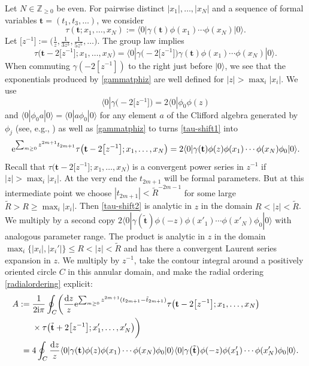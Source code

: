 \documentclass[10pt,a4paper]{amsart}
\numberwithin{equation}{section}
\newcommand{\dd}{\mathrm{d}}
\begin{document}
Let $N\in \mathbb{Z}_{\geq 0}$ be even. For pairwise distinct $|x_1|,\dots,|x_N|$
and a sequence of formal variables $\mathbf{t}=(t_1,t_3,\dots)$, we consider
\[
 \tau(\mathbf{t};x_1,\dots,x_N):= \langle 0 | \gamma(\mathbf{t})
 \phi(x_1)\cdots \phi(x_N)|0\rangle.
\]
Let $\bigl[z^{-1}\bigr]:=\bigl(\frac{1}{z},\frac{1}{3z^3},
\frac{1}{5 z^5},\dots\bigr)$.
 The group law implies
 \begin{equation}
 \tau\bigl(\mathbf{t}-2\bigl[z^{-1}\bigr];x_1,\dots,x_N\bigr) =\langle 0|
 \gamma\bigl(-2\bigl[z^{-1}\bigr]\bigr)
 \gamma(\mathbf{t}) \phi(x_1)\cdots \phi(x_N) |0\rangle.
\label{tau-shift1}
\end{equation}
When commuting $\gamma(-2[z^{-1}])$ to the right just before $|0\rangle$,
we see that the exponentials produced by \eqref{gammatphiz}
are well defined for $|z|>\max_i |x_i|$. We use
\cite[Lemma 7.3.9]{harnad_balogh_2021}
\[
 \langle 0|\gamma\bigl(-2\bigl[z^{-1}\bigr]\bigr)=2
 \langle 0|\phi_0 \phi(z)
\]
and
$\langle 0|\phi_0 a|0 \rangle=
\langle 0|a\phi_0 |0 \rangle$ for any element $a$ of the Clifford algebra
generated by $\phi_j$ (see, e.g., \cite[Exercise 7.5]{harnad_balogh_2021})
as well as \eqref{gammatphiz} to turns \eqref{tau-shift1} into
\begin{equation}
{\rm e}^{\sum_{m \geq 0} z^{2m+1}t_{2m+1}} \tau\bigl(\mathbf{t}-2\bigl[z^{-1}\bigr];x_1,\dots,x_N\bigr)
= 2 \langle 0|\gamma(\mathbf{t}) \phi(z)
\phi(x_1)\cdots \phi(x_N)\phi_0|0\rangle .
 \label{tau-shift2}
\end{equation}
Recall that $\tau\bigl(\mathbf{t}-2\bigl[z^{-1}\bigr];x_1,\dots,x_N\bigr)$ is a convergent
power series in $z^{-1}$ if $|z|>\max_i |x_i|$. At the very end the
$t_{2m+1}$ will be formal parameters. But at this intermediate point we
choose $|t_{2m+1}|<\tilde{R}^{-2m-1}$ for some large
$\tilde{R}> R\geq \max_i |x_i|$. Then \eqref{tau-shift2} is analytic
in $z$ in the domain $R<|z|<\tilde{R}$. We multiply by a second copy
$2 \langle 0|\gamma(\tilde{\mathbf{t}}) \phi(-z) \phi(x'_1)\cdots
\phi(x'_N)\phi_0|0\rangle$ with analogous parameter range. The
product is analytic in $z$ in the domain $\max_i \{|x_i|,|x_i'|\} \leq R <|z|<\tilde{R}$
and has there a convergent Laurent series expansion in $z$. We
multiply by $z^{-1}$, take the contour integral around a positively oriented circle $C$ in this annular domain, and make the radial
ordering \eqref{radialordering} explicit:
\begin{align*}
A:={}& \frac{1}{2{\rm i}\pi} \oint_{C} \biggl(\frac{\dd z}{z}
{\rm e}^{\sum_{m \geq 0} z^{2m+1}(t_{2m+1}-\tilde{t}_{2m+1})}
\tau\bigl(\mathbf{t}-2\bigl[z^{-1}\bigr];x_1,\dots,x_N\bigr)
\\ &
\times \tau\bigl(\tilde{\mathbf{t}}+2\bigl[z^{-1}\bigr];x_1',\dots,x_N'\bigr)\biggr)
\\
={}&  4 \oint_{C} \frac{\dd z}{z}
\langle 0|\gamma(\mathbf{t}) \phi(z) \phi(x_1)\cdots \phi(x_N) \phi_0|0\rangle
\langle 0|\gamma\bigl(\tilde{\mathbf{t}}\bigr) \phi(-z) \phi(x_1')\cdots \phi(x_N')
\phi_0|0\rangle.
\end{align*}
\end{document}
